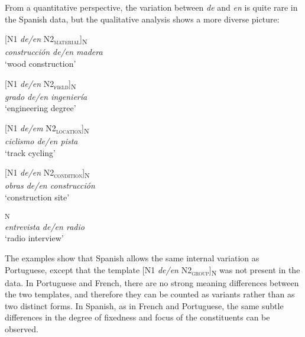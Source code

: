 \documentclass[output=paper]{langsci/langscibook}
\begin{document}
From a quantitative perspective, the variation between \textit{de} and \textit{en} is quite rare in the Spanish data, but the qualitative analysis shows a more diverse picture:

\begin{exe}\ex\begin{minipage}[t]{0.4\textwidth}    %
[N1 \textit{de/en} N2\textsubscript{\scshape material}]\textsubscript{N}\\
\textit{construcción de/en madera }\\
`wood construction'
\end{minipage}\hfill%
\begin{minipage}[t]{0.45\textwidth}
[N1 \textit{de/en} N2\textsubscript{\scshape field}]\textsubscript{N}\\
\textit{grado de/en ingeniería}\\
`engineering degree'
\end{minipage}
\end{exe}

\begin{exe}\ex\begin{minipage}[t]{0.4\textwidth}    %
[N1 \textit{de/em} N2\textsubscript{\scshape location}]\textsubscript{N}\\
\textit{ciclismo de/en pista}\\
`track cycling'
\end{minipage}\hfill%
\begin{minipage}[t]{0.45\textwidth}
[N1 \textit{de/en} N2\textsubscript{\scshape condition}]\textsubscript{N}\\
\textit{obras de/en construcción}\\
`construction site'
\end{minipage}\end{exe}

\ea{}\textsubscript{N}\\
\textit{entrevista de/en radio}\\
`radio interview'
\z

The examples show that Spanish allows the same internal variation as Portuguese, except that the template [N1 \textit{de/en} N2\textsubscript{\scshape group}]\textsubscript{N} was not present in the data. In Portuguese and French, there are no strong meaning differences between the two templates, and therefore they can be counted as variants rather than as two distinct forms. In Spanish, as in French and Portuguese, the same subtle differences in the degree of fixedness and focus of the constituents can be observed. 
\end{document}
